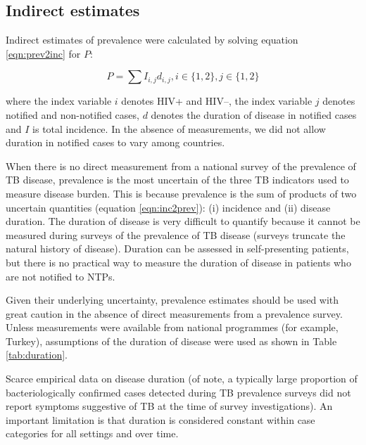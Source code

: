 \subsection{Indirect estimates}
Indirect estimates of prevalence were calculated by solving equation \ref{eqn:prev2inc} for $P$:

\begin{equation}
P = \sum I_{i,j} d_{i,j}, i \in \lbrace 1, 2\rbrace, j \in \lbrace 1, 2\rbrace
\label{eqn:inc2prev}
\end{equation}

where the index variable $i$ denotes HIV+ and HIV–, the index variable $j$ denotes notified and non-notified cases, $d$ denotes the duration of disease in notified cases and $I$ is total incidence. In the absence of measurements, we did not allow duration in notified cases to vary among countries. 

When there is no direct measurement from a national survey of the prevalence of TB disease, prevalence is the most uncertain of the three TB indicators used to measure disease burden. This is because prevalence is the sum of products of two uncertain quantities (equation \ref{eqn:inc2prev}): (i) incidence and (ii) disease duration. The duration of disease is very difficult to quantify because it cannot be measured during surveys of the prevalence of TB disease (surveys truncate the natural history of disease). Duration can be assessed in self-presenting patients, but there is no practical way to measure the duration of disease in patients who are not notified to NTPs.

Given their underlying uncertainty, prevalence estimates should be used with great caution in the absence of direct measurements from a prevalence survey. Unless measurements were available from national programmes (for example, Turkey), assumptions of the duration of disease were used as shown in Table \ref{tab:duration}.

Scarce empirical data on disease duration (of note, a typically large proportion of bacteriologically confirmed cases detected during TB prevalence surveys did not report symptoms suggestive of TB at the time of survey investigations). An important limitation is that duration is considered constant within case categories for all settings and over time.